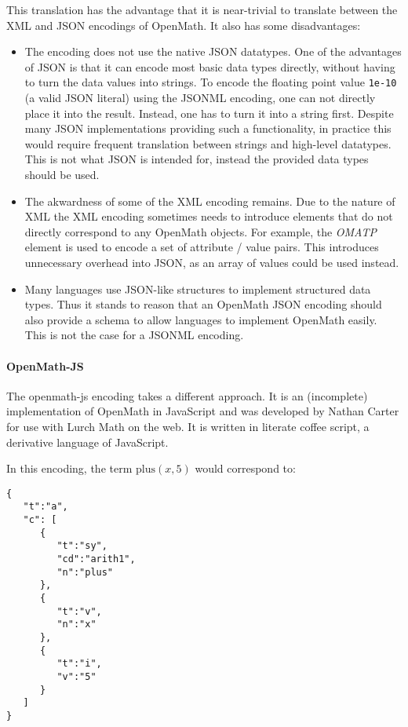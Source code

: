 This translation has the advantage that it is near-trivial to translate between the XML and JSON encodings of OpenMath. 
It also has some disadvantages: 

\begin{itemize}
    \item The encoding does not use the native JSON datatypes. 
    One of the advantages of JSON is that it can encode most basic data types directly, without having to turn the data values into strings. 
    To encode the floating point value \lstinline{1e-10} (a valid JSON literal) using the JSONML encoding, one can not directly place it into the result. 
    Instead, one has to turn it into a string first.   
    Despite many JSON implementations providing such a functionality, in practice this would require frequent translation between strings and high-level datatypes.  
    This is not what JSON is intended for, instead the provided data types should be used. 

    \item The akwardness of some of the XML encoding remains. 
    Due to the nature of XML the XML encoding sometimes needs to introduce elements that do not directly correspond to any OpenMath objects. 
    For example, the \textit{OMATP} element is used to encode a set of attribute / value pairs. 
    This introduces unnecessary overhead into JSON, as an array of values could be used instead. 

    \item Many languages use JSON-like structures to implement structured data types. 
    Thus it stands to reason that an OpenMath JSON encoding should also provide a schema to allow languages to implement OpenMath easily. This is not the case for a JSONML encoding. 
\end{itemize}

\paragraph{OpenMath-JS}
The openmath-js  encoding takes a different approach. 
It is an (incomplete) implementation of OpenMath in JavaScript and was developed by Nathan Carter for use with Lurch Math on the web. 
It is written in literate coffee script, a derivative language of JavaScript. 

In this encoding, the term $\mathrm{plus}(x, 5)$ would correspond to: 
\begin{lstlisting}
{  
   "t":"a",
   "c": [  
      {  
         "t":"sy",
         "cd":"arith1",
         "n":"plus"
      },
      {  
         "t":"v",
         "n":"x"
      },
      {  
         "t":"i",
         "v":"5"
      }
   ]
}
\end{lstlisting}

